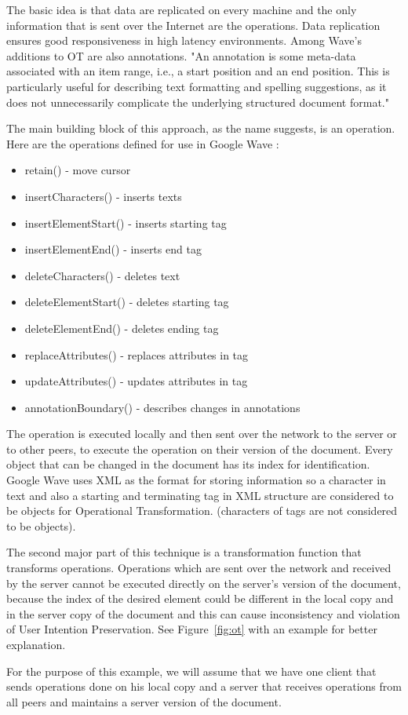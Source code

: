 \documentclass[12pt,oneside]{fithesis2}
\begin{document}
\par The basic idea is that data are replicated on every machine and the only information that is sent over the Internet are the operations. Data replication ensures good responsiveness in high latency environments. Among Wave's additions to OT are also annotations. "An annotation is some meta-data associated with an item range, i.e., a start position and an end position. This is particularly useful for describing text formatting and spelling suggestions, as it does not unnecessarily complicate the underlying structured document format." \cite{Google} \par The main building block of this approach, as the name suggests, is an operation. Here are the operations defined for use in Google Wave \cite{Google}:
\begin{itemize}
\item retain() - move cursor
\item insertCharacters() - inserts texts
\item insertElementStart() - inserts starting tag
\item insertElementEnd() - inserts end tag
\item deleteCharacters() - deletes text
\item deleteElementStart() - deletes starting tag
\item deleteElementEnd() - deletes ending tag
\item replaceAttributes() - replaces attributes in tag
\item updateAttributes() - updates attributes in tag
\item annotationBoundary() - describes changes in annotations
\end{itemize}
\par The operation is executed locally and then sent over the network to the server or to other peers, to execute the operation on their version of the document. Every object that can be changed in the document has its index for identification. Google Wave uses XML as the format for storing information so a character in text and also a starting and terminating tag in XML structure are considered to be objects for Operational Transformation.  (characters of tags are not considered to be objects). 
\par The second major part of this technique is a transformation function that transforms operations. Operations which are sent over the network and received by the server cannot be executed directly on the server's version of the document, because the index of the desired element could be different in the local copy and in the server copy of the document and this can cause inconsistency and violation of User Intention Preservation. See Figure~\ref{fig:ot} with an example for better explanation. \par For the purpose of this example, we will assume that we have one client that sends operations done on his local copy and a server that receives operations from all peers and maintains a server version of the document. 
\end{document}
